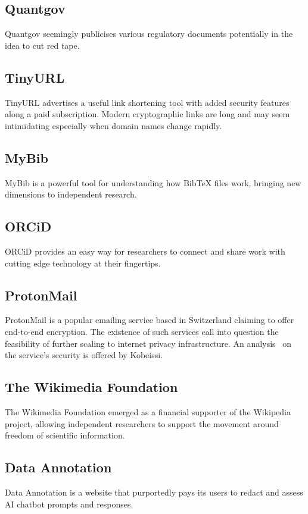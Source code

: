 \documentclass[11pt]{article}
\begin{document}
\subsection{Quantgov~\cite{quantgovhome_2025_quantgov}}
Quantgov seemingly publicises various regulatory documents potentially in the idea to cut red tape.
\subsection{TinyURL~\cite{a2019_tinyurlcom}}
TinyURL advertises a useful link shortening tool with added security features along a paid subscription. Modern cryptographic links are long and may seem intimidating especially when domain names change rapidly.
\subsection{MyBib~\cite{mybib_2018_mybib}}
MyBib is a powerful tool for understanding how BibTeX files work, bringing new dimensions to independent research.
\subsection{ORCiD~\cite{orcid_2019_orcid}}
ORCiD provides an easy way for researchers to connect and share work with cutting edge technology at their fingertips.
\subsection{ProtonMail~\cite{kobeissi_2018_an}}
ProtonMail is a popular emailing service based in Switzerland claiming to offer end-to-end encryption. The existence of such services call into question the feasibility of further scaling to internet privacy infrastructure. An analysis~\cite{kobeissi_2018_an} on the service's security is offered by Kobeissi.
\subsection{The Wikimedia Foundation~\cite{a2018_wikimedia}}
The Wikimedia Foundation emerged as a financial supporter of the Wikipedia project, allowing independent researchers to support the movement around freedom of scientific information.
\subsection{Data Annotation~\cite{data}}
Data Annotation is a website that purportedly pays its users to redact and assess AI chatbot prompts and responses.
\end{document}
